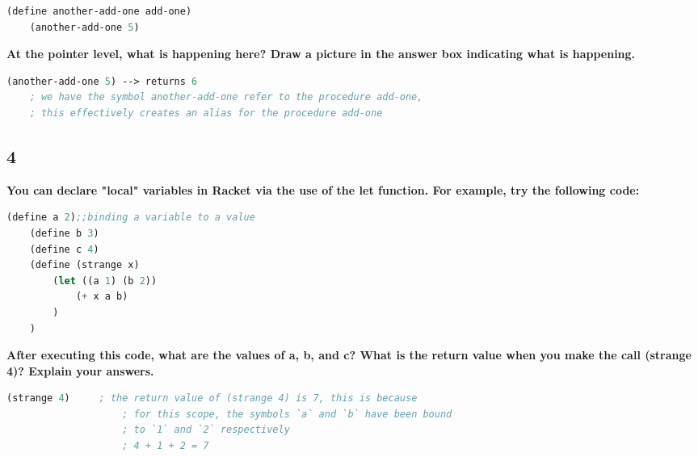 \documentclass{article}
\begin{document}
\begin{lstlisting}[language=lisp]
    (define another-add-one add-one) 
    (another-add-one 5) 
\end{lstlisting}

\begin{adjustwidth}{2em}{0em}
    \textbf{At the pointer level, what is happening here? Draw a picture in the answer box indicating what is happening.}
\end{adjustwidth}

\begin{lstlisting}[language=lisp,style=redStyle]
    (another-add-one 5) --> returns 6
    ; we have the symbol another-add-one refer to the procedure add-one, 
    ; this effectively creates an alias for the procedure add-one
\end{lstlisting}

\subsection*{4}
\begin{adjustwidth}{2em}{0em}
    \textbf{You can declare "local" variables in Racket via the use of the let function. For example, try the following code: }
\end{adjustwidth}

\begin{lstlisting}[language=lisp]
    (define a 2);;binding a variable to a value 
    (define b 3) 
    (define c 4) 
    (define (strange x) 
        (let ((a 1) (b 2)) 
            (+ x a b)
        )
    ) 
\end{lstlisting}

\begin{adjustwidth}{2em}{0em}
    \textbf{After executing this code, what are the values of a, b, and c? What is the return value when you make the call (strange 4)? Explain your answers.}
\end{adjustwidth}

\begin{lstlisting}[language=lisp,style=redStyle]
    (strange 4)     ; the return value of (strange 4) is 7, this is because
                    ; for this scope, the symbols `a` and `b` have been bound
                    ; to `1` and `2` respectively
                    ; 4 + 1 + 2 = 7 
\end{lstlisting}
\end{document}
